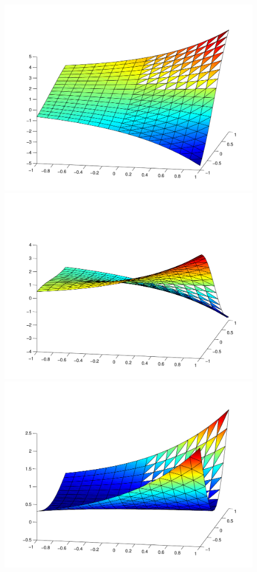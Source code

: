 \begin{figure}[hbh]
\begin{center}
\includegraphics[height=0.27\textheight]{plots/stokesVVPHybrid/pressurecubic16x16.pdf}
\includegraphics[height=0.27\textheight]{plots/stokesVVPHybrid/u1cubic16x16.pdf}
\includegraphics[height=0.27\textheight]{plots/stokesVVPHybrid/u2cubic16x16.pdf}

\end{center}
\end{figure}
